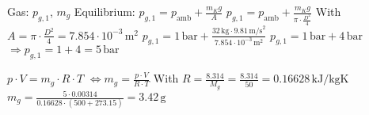 Gas: \( p_{g,1} \), \( m_g \)  
Equilibrium: \( p_{g,1} = p_{\text{amb}} + \frac{m_K g}{A} \)  
\( p_{g,1} = p_{\text{amb}} + \frac{m_K g}{\pi \cdot \frac{D^2}{4}} \)  
With \( A = \pi \cdot \frac{D^2}{4} = 7.854 \cdot 10^{-3} \, \text{m}^2 \)  
\( p_{g,1} = 1 \, \text{bar} + \frac{32 \, \text{kg} \cdot 9.81 \, \text{m/s}^2}{7.854 \cdot 10^{-3} \, \text{m}^2} \)  
\( p_{g,1} = 1 \, \text{bar} + 4 \, \text{bar} \)  
\( \Rightarrow p_{g,1} = 1 + 4 = 5 \, \text{bar} \)  

\( p \cdot V = m_g \cdot R \cdot T \)  
\( \Leftrightarrow m_g = \frac{p \cdot V}{R \cdot T} \)  
With \( R = \frac{8.314}{M_g} = \frac{8.314}{50} = 0.16628 \, \text{kJ/kgK} \)  
\( m_g = \frac{5 \cdot 0.00314}{0.16628 \cdot (500 + 273.15)} = 3.42 \, \text{g} \)